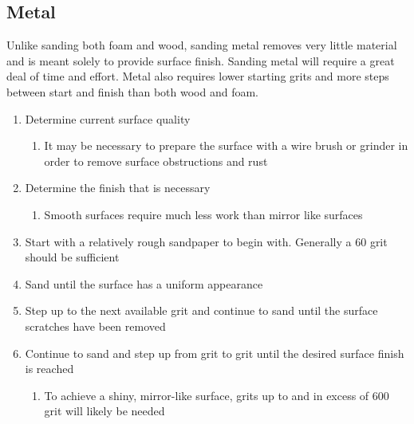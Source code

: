 \subsection{Metal}
Unlike sanding both foam and wood, sanding metal removes very little material and is meant solely to provide surface finish. Sanding metal will require a great deal of time and effort. Metal also requires lower starting grits and more steps between start and finish than both wood and foam.
\begin{enumerate}
\item Determine current surface quality
	\begin{enumerate}
	\item It may be necessary to prepare the surface with a wire brush or grinder in order to remove surface obstructions and rust
	\end{enumerate}
\item Determine the finish that is necessary
	\begin{enumerate}
	\item Smooth surfaces require much less work than mirror like surfaces
	\end{enumerate}
\item Start with a relatively rough sandpaper to begin with. Generally a 60 grit should be sufficient
\item Sand until the surface has a uniform appearance
\item Step up to the next available grit and continue to sand until the surface scratches have been removed
\item Continue to sand and step up from grit to grit until the desired surface finish is reached
\begin{enumerate}
	\item To achieve a shiny, mirror-like surface, grits up to and in excess of 600 grit will likely be needed
\end{enumerate}
\end{enumerate}
